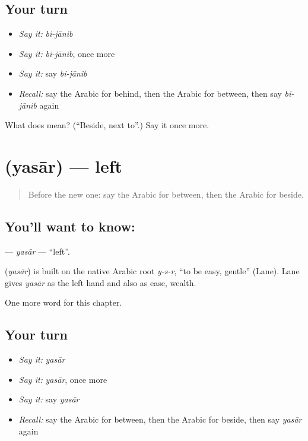 \subsection*{Your turn}
\begin{itemize}
\raggedright
  \item \emph{Say it:} \emph{bi-jānib}
  \item \emph{Say it:} \emph{bi-jānib}, once more
  \item \emph{Say it:} say \emph{bi-jānib}
  \item \emph{Recall:} say the Arabic for behind, then the Arabic for between, then say \emph{bi-jānib} again
\end{itemize}

\begin{tcolorbox}[breakable,colback=teal!4,colframe=teal!35!black,title={Before you move on}]
What does  mean? (\textquotedblleft{}Beside, next to\textquotedblright{}.) Say it once more.
\end{tcolorbox}
\section[\texorpdfstring{\ar{يسار} (yasār)}{يسار (yasār)}]{ (yasār) — left}

\label{lesson:AR-C103-yasar}



\begin{quote}
Before the new one: say the Arabic for between, then the Arabic for beside.
\end{quote}

\subsection*{You'll want to know: }
\textbf{} — \emph{yasār} — \textquotedblleft{}left\textquotedblright{}.

\begin{cousinweb}
\textbf{} (\emph{yasār}) is built on the native Arabic root \emph{y-s-r}, \textquotedblleft{}to be easy, gentle\textquotedblright{} (Lane). Lane gives \emph{yasār} as the left hand and also as ease, wealth.
\end{cousinweb}

\begin{grammarlens}[title={What you've built}]
One more word for this chapter.
\end{grammarlens}

\subsection*{Your turn}
\begin{itemize}
\raggedright
  \item \emph{Say it:} \emph{yasār}
  \item \emph{Say it:} \emph{yasār}, once more
  \item \emph{Say it:} say \emph{yasār}
  \item \emph{Recall:} say the Arabic for between, then the Arabic for beside, then say \emph{yasār} again
\end{itemize}

